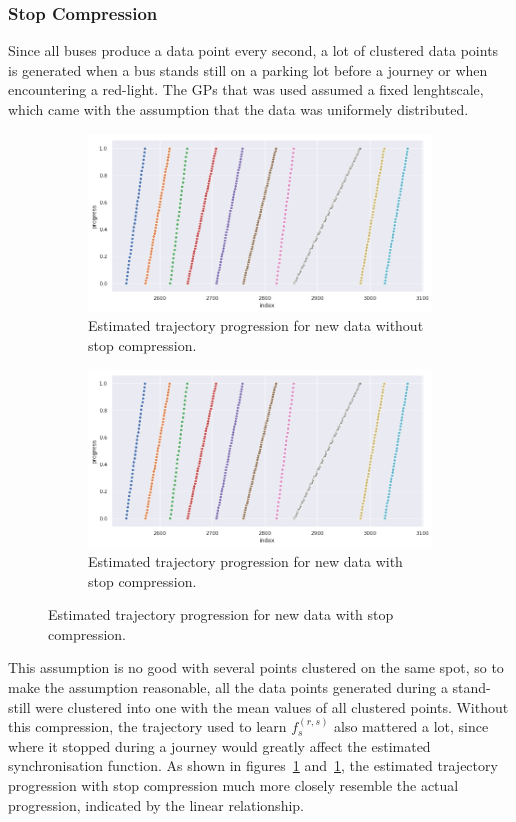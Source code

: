 \subsubsection{Stop Compression}
Since all buses produce a data point every second, a lot of clustered data points is generated when a bus stands still on a parking lot before a journey or when encountering a red-light. The GPs that was used assumed a fixed lenghtscale, which came with the assumption that the data was uniformely distributed.
\begin{figure}[H]
  \begin{subfigure}[b]{0.5\textwidth}
    \includegraphics[width=\textwidth]{figures/normalised-stop-compressed.png}
    \caption{Estimated trajectory progression for new data without stop compression. }
    \label{fig:progression-without-stop-compression}
  \end{subfigure}
  \begin{subfigure}[b]{0.5\textwidth}
    \includegraphics[width=\textwidth]{figures/normalised-stop-compressed.png}
    \caption{Estimated trajectory progression for new data with stop compression.}
    \label{fig:progression-with-stop-compression}
  \end{subfigure}
\end{figure}
This assumption is no good with several points clustered on the same spot, so to make the assumption reasonable, all the data points generated during a stand-still were clustered into one with the mean values of all clustered points. Without this compression, the trajectory used to learn $f^{(r,s)}_s$ also mattered a lot, since where it stopped during a journey would greatly affect the estimated synchronisation function. As shown in figures~\ref{fig:progression-without-stop-compression} and~\ref{fig:progression-without-stop-compression}, the estimated trajectory progression with stop compression much more closely resemble the actual progression, indicated by the linear relationship.

